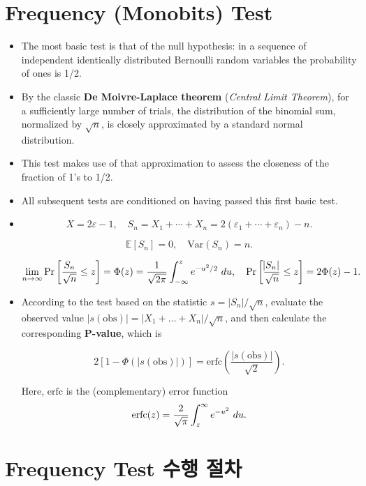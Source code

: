 \documentclass[12pt,openany]{book}
\theoremstyle{definition}
\begin{document}
	\newpage
	\section{Frequency (Monobits) Test}
	
	\begin{itemize}
		\item The most basic test is that of the null hypothesis: in a sequence of independent identically distributed Bernoulli random variables the probability of ones is 1/2.
		\item By the classic \textbf{De Moivre-Laplace theorem} (\textit{Central Limit Theorem}), for a sufficiently large number of trials, the distribution of the binomial sum, normalized by $\sqrt{n}$, is closely approximated by a standard normal distribution.
		\item This test makes use of that approximation to assess the closeness of the fraction of 1's to 1/2.
		\item All subsequent tests are conditioned on having passed this first basic test.
		\item 
		\[
		X = 2\varepsilon-1, \quad S_n = X_1 + \cdots + X_n = 2(\varepsilon_1 + \cdots + \varepsilon_n) - n.
		\]
		
		\[
		\mathbb{E}[S_n] = 0, \quad \text{Var}(S_n) = n.
		\]
		
		\[
		\lim\limits_{n\to\infty}\Pr\sbr{\frac{S_n}{\sqrt{n}}\leq z}=\Phi(z)=\frac{1}{\sqrt{2\pi}}\int_{-\infty}^{z}e^{-u^2/2}\ du,\quad \Pr\sbr{\frac{\abs{S_n}}{\sqrt{n}}\leq z}=2\Phi(z)-1.
		\]
		
		\item According to the test based on the statistic $s = |S_n|/\sqrt{n}$, evaluate the observed value $|s(\text{obs})| = |X_1 + \ldots + X_n|/\sqrt{n}$, and then calculate the corresponding \textbf{P-value}, which is
		
		\[
		2\left[1 - \Phi\left({|s(\text{obs})|}\right)\right] = \text{erfc}\left(\frac{|s(\text{obs})|}{\sqrt{2}}\right).
		\]
		
		Here, $\text{erfc}$ is the (complementary) error function \[
		\textnormal{erfc}(z)=\frac{2}{\sqrt{\pi}}\int_{z}^{\infty}e^{-u^2}\ du.
		\]
	\end{itemize}
	
	
	
	\section*{Frequency Test 수행 절차}
	
\end{document}
